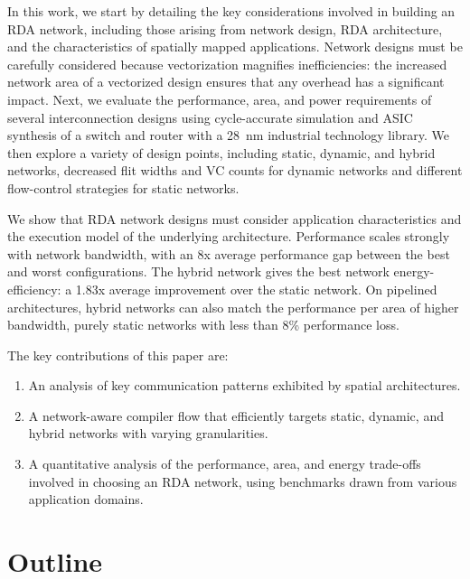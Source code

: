 In this work, we start by detailing the key considerations involved in building an RDA network, including those arising from network design, RDA architecture, and the characteristics of spatially mapped applications.
Network designs must be carefully considered because vectorization magnifies inefficiencies: the increased network area of a vectorized design ensures that any overhead has a significant impact.
Next, we evaluate the performance, area, and power requirements of several interconnection designs using cycle-accurate simulation and ASIC synthesis of a switch and router with a \SI{28}{nm} industrial technology library.
We then explore a variety of design points, including static, dynamic, and hybrid networks, decreased flit widths and VC counts for dynamic networks and different flow-control strategies for static networks.

We show that RDA network designs must consider application characteristics and the execution model of the underlying architecture.
Performance scales strongly with network bandwidth, with an 8x average performance gap between the best and worst configurations. 
The hybrid network gives the best network energy-efficiency: a 1.83x average improvement over the static network. On pipelined architectures,
hybrid networks can also match the performance per area of higher bandwidth, purely static networks with less than 8\% performance loss.

The key contributions of this paper are:
\begin{enumerate}
    \item An analysis of key communication patterns exhibited by spatial architectures.
    \item A network-aware compiler flow that efficiently targets static, dynamic, and hybrid networks with varying granularities.
    \item A quantitative analysis of the performance, area, and energy trade-offs involved in choosing an RDA network, using benchmarks drawn from various application domains.
\end{enumerate}

\section{Outline}
